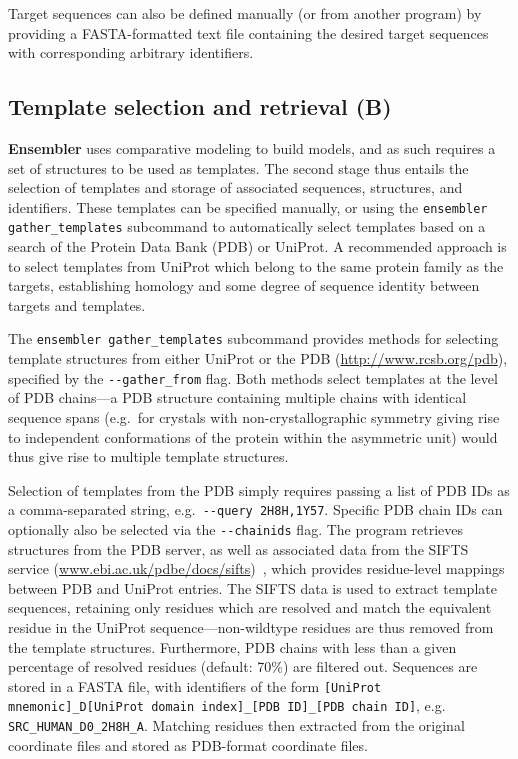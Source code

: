 \documentclass[aps,prl,preprint,nofootinbib,superscriptaddress,linenumbers]{revtex4-1}
\begin{document}
Target sequences can also be defined manually (or from another program) by providing a FASTA-formatted text file containing the desired target sequences with corresponding arbitrary identifiers.

\subsection{Template selection and retrieval (B)}

{\bf Ensembler} uses comparative modeling to build models, and as such requires a set of structures to be used as templates.
The second stage thus entails the selection of templates and storage of associated sequences, structures, and identifiers.
These templates can be specified manually, or using the {\tt ensembler gather\_templates} subcommand to automatically select templates based on a search of the Protein Data Bank (PDB) or UniProt.
A recommended approach is to select templates from UniProt which belong to the same protein family as the targets, establishing homology and some degree of sequence identity between targets and templates.

The {\tt ensembler gather\_templates} subcommand provides methods for selecting template structures from either UniProt or the PDB (\url{http://www.rcsb.org/pdb}), specified by the {\tt -{}-gather\_from} flag.
Both methods select templates at the level of PDB chains---a PDB structure containing multiple chains with identical sequence spans (e.g.~for crystals with non-crystallographic symmetry giving rise to independent conformations of the protein within the asymmetric unit) would thus give rise to multiple template structures.

Selection of templates from the PDB simply requires passing a list of PDB IDs as a comma-separated string, e.g.~{\tt -{}-query 2H8H,1Y57}.
Specific PDB chain IDs can optionally also be selected via the {\tt -{}-chainids} flag.
The program retrieves structures from the PDB server, as well as associated data from the SIFTS service (\href{http://www.ebi.ac.uk/pdbe/docs/sifts/}{www.ebi.ac.uk/pdbe/docs/sifts})~\cite{velankar:2013:sifts}, which provides residue-level mappings between PDB and UniProt entries.
The SIFTS data is used to extract template sequences, retaining only residues which are resolved and match the equivalent residue in the UniProt sequence---non-wildtype residues are thus removed from the template structures.
Furthermore, PDB chains with less than a given percentage of resolved residues (default: 70\%) are filtered out.
Sequences are stored in a FASTA file, with identifiers of the form {\tt [UniProt mnemonic]\_D[UniProt domain index]\_[PDB ID]\_[PDB chain ID]}, e.g. {\tt SRC\_HUMAN\_D0\_2H8H\_A}.
Matching residues then extracted from the original coordinate files and stored as PDB-format coordinate files.
\end{document}
